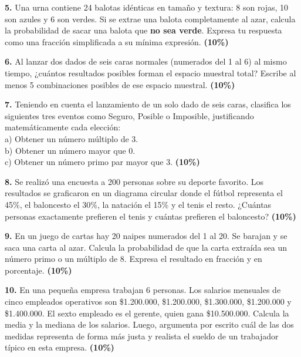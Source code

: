 \documentclass[12pt, letterpaper]{article}
\begin{document}
	\noindent \textbf{5.} Una urna contiene 24 balotas idénticas en tamaño y textura: 8 son rojas, 10 son azules y 6 son verdes. Si se extrae una balota completamente al azar, calcula la probabilidad de sacar una balota que \textbf{no sea verde}. Expresa tu respuesta como una fracción simplificada a su mínima expresión. \hfill \textbf{(10\%)}
	\vspace{0.4cm}
	
	\noindent \textbf{6.} Al lanzar dos dados de seis caras normales (numerados del 1 al 6) al mismo tiempo, ¿cuántos resultados posibles forman el espacio muestral total? Escribe al menos 5 combinaciones posibles de ese espacio muestral. \hfill \textbf{(10\%)}
	\vspace{0.4cm}
	
	\noindent \textbf{7.} Teniendo en cuenta el lanzamiento de un solo dado de seis caras, clasifica los siguientes tres eventos como Seguro, Posible o Imposible, justificando matemáticamente cada elección: \\
	a) Obtener un número múltiplo de 3. \\
	b) Obtener un número mayor que 0. \\
	c) Obtener un número primo par mayor que 3. \hfill \textbf{(10\%)}
	\vspace{0.4cm}
	
	\noindent \textbf{8.} Se realizó una encuesta a 200 personas sobre su deporte favorito. Los resultados se graficaron en un diagrama circular donde el fútbol representa el 45\%, el baloncesto el 30\%, la natación el 15\% y el tenis el resto. ¿Cuántas personas exactamente prefieren el tenis y cuántas prefieren el baloncesto? \hfill \textbf{(10\%)}
	\vspace{0.4cm}
	
	\noindent \textbf{9.} En un juego de cartas hay 20 naipes numerados del 1 al 20. Se barajan y se saca una carta al azar. Calcula la probabilidad de que la carta extraída sea un número primo o un múltiplo de 8. Expresa el resultado en fracción y en porcentaje. \hfill \textbf{(10\%)}
	\vspace{0.4cm}
	
	\noindent \textbf{10.} En una pequeña empresa trabajan 6 personas. Los salarios mensuales de cinco empleados operativos son \$1.200.000, \$1.200.000, \$1.300.000, \$1.200.000 y \$1.400.000. El sexto empleado es el gerente, quien gana \$10.500.000. Calcula la media y la mediana de los salarios. Luego, argumenta por escrito cuál de las dos medidas representa de forma más justa y realista el sueldo de un trabajador típico en esta empresa. \hfill \textbf{(10\%)}
	
\end{document}
